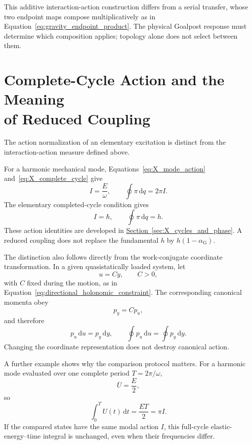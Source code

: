 This additive interaction-action construction differs from a serial transfer, whose two endpoint maps compose multiplicatively as in Equation~\eqref{eq:gravity_endpoint_product}. The physical Goalpost response must determine which composition applies; topology alone does not select between them.

\section[Complete-Cycle Action and the Meaning of Reduced Coupling]{Complete-Cycle Action and the Meaning\\of Reduced Coupling}

The action normalization of an elementary excitation is distinct from the interaction-action measure defined above.

For a harmonic mechanical mode, Equations~\eqref{eq:X_mode_action} and~\eqref{eq:X_complete_cycle} give
\begin{equation}
    I=\frac{E}{\omega},
    \qquad
    \oint\pi\,\mathrm dq=2\pi I.
\end{equation}
The elementary completed-cycle condition gives
\begin{equation}
    I=\hbar,
    \qquad
    \oint\pi\,\mathrm dq=h.
\end{equation}
These action identities are developed in \hyperref[sec:X_cycles_and_phase]{Section~\ref*{sec:X_cycles_and_phase}}. A reduced coupling does not replace the fundamental $h$ by $h(1-\alpha_{\mathrm G})$.

The distinction also follows directly from the work-conjugate coordinate transformation. In a given quasistatically loaded system, let
\begin{equation}
    u=Cy,
    \qquad C>0,
\end{equation}
with $C$ fixed during the motion, as in Equation~\eqref{eq:directional_holonomic_constraint}. The corresponding canonical momenta obey
\begin{equation}
    p_y=Cp_u,
\end{equation}
and therefore
\begin{equation}
    \boxed{
    p_u\,\mathrm du=p_y\,\mathrm dy,
    \qquad
    \oint p_u\,\mathrm du=\oint p_y\,\mathrm dy
    }.
\end{equation}
Changing the coordinate representation does not destroy canonical action.

A further example shows why the comparison protocol matters. For a harmonic mode evaluated over one complete period $T=2\pi/\omega$,
\begin{equation}
    \overline U=\frac E2,
\end{equation}
so
\begin{equation}
    \boxed{
    \int_0^T U(t)\,\mathrm dt
    =\frac{ET}{2}=\pi I
    }.
\end{equation}
If the compared states have the same modal action $I$, this full-cycle elastic-energy--time integral is unchanged, even when their frequencies differ.

